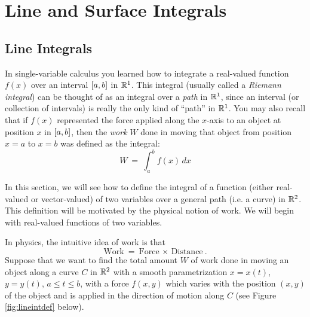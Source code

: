 \chapter{Line and Surface Integrals}
\section{Line Integrals}
In single-variable calculus you learned how to integrate a real-valued function $f(x)$ over an interval $\lbrack a,b \rbrack$
in $\mathbb{R}^{1}$. This integral (usually called a \emph{Riemann integral})
can be thought of as an integral over a \emph{path} in $\mathbb{R}^{1}$, since an interval
(or collection of intervals) is really the only kind of ``path'' in $\mathbb{R}^{1}$. You may also recall that if $f(x)$
represented the force applied along the $x$-axis to an object at position $x$ in $\lbrack a,b \rbrack$, then the \emph{work}
$W$ done in moving that object from position $x=a$ to $x=b$ was defined as the integral:
\begin{displaymath}
W ~=~ \int_a^b f(x)\,dx
\end{displaymath}

In this section, we will see how to define the integral of a function (either real-valued or vector-valued) of
two variables over a general path (i.e. a curve) in $\mathbb{R}^{2}$. This
definition will be motivated by the physical notion of work. We will begin with real-valued functions of
two variables.

In physics, the intuitive idea of work is that
\begin{displaymath}
 \text{Work} ~=~ \text{Force}\,\times\,\text{Distance} ~.
\end{displaymath}
Suppose that we want to find the total amount $W$ of work done in moving an object along a curve $C$ in
$\mathbb{R}^{2}$ with
a smooth parametrization $x=x(t)$, $y=y(t)$, $a \le t \le b$, with a force $f(x,y)$ which varies with the position
$(x,y)$ of the object and is applied in the direction of motion along $C$
(see Figure \ref{fig:lineintdef} below).\vspace{-2mm}

